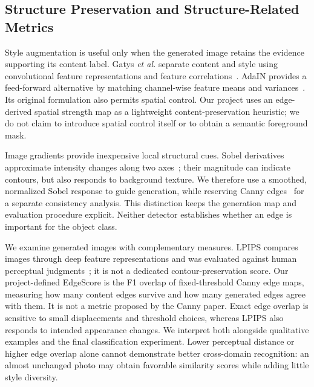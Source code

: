 \subsection{Structure Preservation and Structure-Related Metrics}
\label{sec:m3_related_structure}

Style augmentation is useful only when the generated image retains the evidence
supporting its content label. Gatys \textit{et al.} separate content and style
using convolutional feature representations and feature correlations~\cite{gatys2016style}.
AdaIN provides a feed-forward alternative by matching channel-wise feature means
and variances~\cite{huang2017adain}. Its original formulation also permits spatial
control. Our project uses an edge-derived spatial strength map as a lightweight
content-preservation heuristic; we do not claim to introduce spatial control
itself or to obtain a semantic foreground mask.

Image gradients provide inexpensive local structural cues. Sobel derivatives
approximate intensity changes along two axes~\cite{opencv_sobel}; their magnitude
can indicate contours, but also responds to background texture. We therefore
use a smoothed, normalized Sobel response to guide generation, while reserving
Canny edges~\cite{canny1986} for a separate consistency analysis. This distinction
keeps the generation map and evaluation procedure explicit. Neither detector
establishes whether an edge is important for the object class.

We examine generated images with complementary measures. LPIPS compares images
through deep feature representations and was evaluated against human perceptual
judgments~\cite{zhang2018lpips}; it is not a dedicated contour-preservation score.
Our project-defined EdgeScore is the F1 overlap of fixed-threshold Canny edge maps,
measuring how many content edges survive and how many generated edges agree with
them. It is not a metric proposed by the Canny paper. Exact edge overlap is
sensitive to small displacements and threshold choices, whereas LPIPS also
responds to intended appearance changes. We interpret both alongside qualitative
examples and the final classification experiment. Lower perceptual distance or
higher edge overlap alone cannot demonstrate better cross-domain recognition:
an almost unchanged photo may obtain favorable similarity scores while adding
little style diversity.
